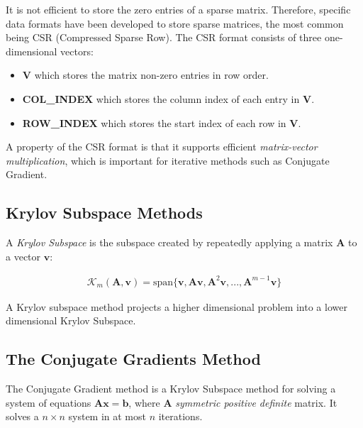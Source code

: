 It is not efficient to store the zero entries of a sparse matrix. Therefore, specific data formats have been developed to store sparse matrices, the most common being CSR (Compressed Sparse Row). The CSR format consists of three one-dimensional vectors:

\begin{itemize}
\item \textbf{V} which stores the matrix non-zero entries in row order.
\item \textbf{COL\_INDEX} which stores the column index of each entry in \textbf{V}.
\item \textbf{ROW\_INDEX} which stores the start index of each row in \textbf{V}.
\end{itemize}

A property of the CSR format is that it supports efficient \emph{matrix-vector multiplication}, which is important for iterative methods such as Conjugate Gradient.


%
%
%
\subsection{Krylov Subspace Methods}

A \emph{Krylov Subspace} is the subspace created by repeatedly applying a matrix $\mathbf{A}$ to a vector $\mathbf{v}$:

\begin{align}
\mathcal{K}_m(\mathbf{A}, \mathbf{v}) = \text{span\{}\mathbf{v}, \mathbf{A}\mathbf{v}, \mathbf{A}^2\mathbf{v}, ..., \mathbf{A}^{m-1}\mathbf{v}\text{\}}
\end{align}

A Krylov subspace method projects a higher dimensional problem into a lower dimensional Krylov Subspace.



%
%
\subsection{The Conjugate Gradients Method}

The Conjugate Gradient method is a Krylov Subspace method for solving a system of equations $\mathbf{A}\mathbf{x}=\mathbf{b}$, where $\mathbf{A}$ \emph{symmetric positive definite} matrix. It solves a $n \times n$ system in at most $n$ iterations.

